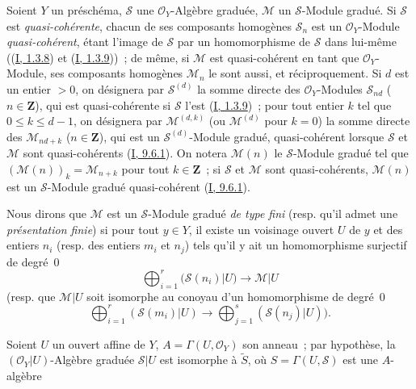 \begin{env}[3.1.1]
\label{II.3.1.1-fr}
Soient $Y$ un préschéma, $\mathcal{S}$ une $\mathcal{O}_Y$-Algèbre graduée,
$\mathcal{M}$ un $\mathcal{S}$-Module gradué. Si $\mathcal{S}$ est
\emph{quasi-cohérente}, chacun de ses composants homogènes $\mathcal{S}_n$ est
un $\mathcal{O}_Y$-Module \emph{quasi-cohérent}, étant l'image de
$\mathcal{S}$ par un homomorphisme de $\mathcal{S}$ dans lui-même
((\hyperref[I.1.3.8-fr]{I, 1.3.8}) et
(\hyperref[I.1.3.9-fr]{I, 1.3.9}))~; de même, si $\mathcal{M}$ est
quasi-cohérent en tant que $\mathcal{O}_Y$-Module, ses composants homogènes
$\mathcal{M}_n$ le sont aussi, et réciproquement. Si $d$ est un entier $>0$,
on désignera par $\mathcal{S}^{(d)}$ la somme directe des
$\mathcal{O}_Y$-Modules $\mathcal{S}_{nd}$ ($n\in\mathbf{Z}$), qui est
quasi-cohérente si $\mathcal{S}$ l'est
(\hyperref[I.1.3.9-fr]{I, 1.3.9})~; pour tout entier $k$ tel que
$0\leq k\leq d-1$, on désignera par $\mathcal{M}^{(d,k)}$ (ou
$\mathcal{M}^{(d)}$ pour $k=0$) la somme directe des
$\mathcal{M}_{nd+k}$ ($n\in\mathbf{Z}$), qui est un
$\mathcal{S}^{(d)}$-Module gradué, quasi-cohérent lorsque $\mathcal{S}$ et
$\mathcal{M}$ sont quasi-cohérents (\hyperref[I.9.6.1-fr]{I, 9.6.1}). On
notera $\mathcal{M}(n)$ le $\mathcal{S}$-Module gradué tel que
$(\mathcal{M}(n))_k=\mathcal{M}_{n+k}$ pour tout $k\in\mathbf{Z}$~; si
$\mathcal{S}$ et $\mathcal{M}$ sont quasi-cohérents, $\mathcal{M}(n)$ est un
$\mathcal{S}$-Module gradué quasi-cohérent
(\hyperref[I.9.6.1-fr]{I, 9.6.1}).

Nous dirons que $\mathcal{M}$ est un $\mathcal{S}$-Module gradué
\emph{de type fini} (resp. qu'il admet une \emph{présentation finie}) si pour
tout $y\in Y$, il existe un voisinage ouvert $U$ de $y$ et des entiers $n_i$
(resp. des entiers $m_i$ et $n_j$) tels qu'il y ait un homomorphisme surjectif
de degré~$0$
\[
  \bigoplus_{i=1}^r(\mathcal{S}(n_i)|U)\longrightarrow\mathcal{M}|U
\]
(resp. que $\mathcal{M}|U$ soit isomorphe au conoyau d'un homomorphisme de
degré~$0$
\[
  \bigoplus_{i=1}^r(\mathcal{S}(m_i)|U)
  \longrightarrow\bigoplus_{j=1}^s(\mathcal{S}(n_j)|U)).
\]

Soient $U$ un ouvert affine de $Y$, $A=\Gamma(U,\mathcal{O}_Y)$ son anneau~;
par hypothèse, la $(\mathcal{O}_Y|U)$-Algèbre graduée $\mathcal{S}|U$ est
isomorphe à $\widetilde{S}$, où $S=\Gamma(U,\mathcal{S})$ est une
$A$-algèbre



\end{env}

